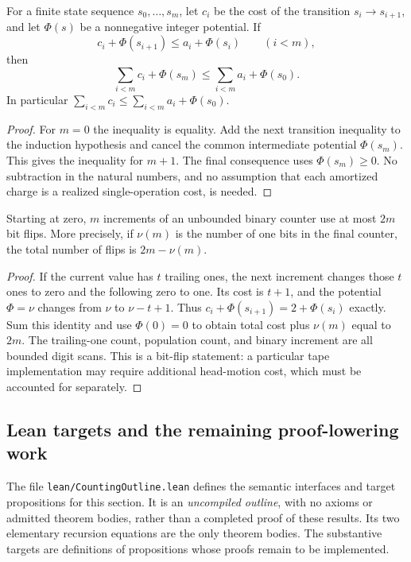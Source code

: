 \begin{theorem}
\label{thm:R22}
For a finite state sequence $s_0,\ldots,s_m$, let $c_i$ be the cost of
the transition $s_i\to s_{i+1}$, and let $\Phi(s)$ be a nonnegative
integer potential. If
\[
 c_i+\Phi(s_{i+1})\leq a_i+\Phi(s_i)\qquad(i<m),
\]
then
\[
 \sum_{i<m}c_i+\Phi(s_m)
 \leq\sum_{i<m}a_i+\Phi(s_0).
\]
In particular $\sum_{i<m}c_i\leq\sum_{i<m}a_i+\Phi(s_0)$.
\end{theorem}
\begin{proof}
For $m=0$ the inequality is equality. Add the next transition inequality
to the induction hypothesis and cancel the common intermediate potential
$\Phi(s_m)$. This gives the inequality for $m+1$. The final consequence
uses $\Phi(s_m)\geq0$. No subtraction in the natural numbers, and no
assumption that each amortized charge is a realized single-operation
cost, is needed.
\end{proof}

\begin{corollary}
\label{thm:R23}
Starting at zero, $m$ increments of an unbounded binary counter use at
most $2m$ bit flips. More precisely, if $\nu(m)$ is the number of one bits
in the final counter, the total number of flips is $2m-\nu(m)$.
\end{corollary}
\begin{proof}
If the current value has $t$ trailing ones, the next increment changes
those $t$ ones to zero and the following zero to one. Its cost is $t+1$,
and the potential $\Phi=\nu$ changes from $\nu$ to $\nu-t+1$.
Thus $c_i+\Phi(s_{i+1})=2+\Phi(s_i)$ exactly. Sum this identity and use
$\Phi(0)=0$ to obtain total cost plus $\nu(m)$ equal to $2m$.
The trailing-one count, population count, and binary increment are all
bounded digit scans. This is a bit-flip statement: a particular tape
implementation may require additional head-motion cost, which must be
accounted for separately.
\end{proof}


\subsection{Lean targets and the remaining proof-lowering work}

The file \texttt{lean/CountingOutline.lean} defines the semantic interfaces
and target propositions for this section. It is an \emph{uncompiled outline},
with no axioms or admitted theorem bodies, rather than a completed proof of
these results. Its two elementary recursion equations are the only theorem
bodies. The substantive targets are definitions of propositions whose proofs
remain to be implemented.

